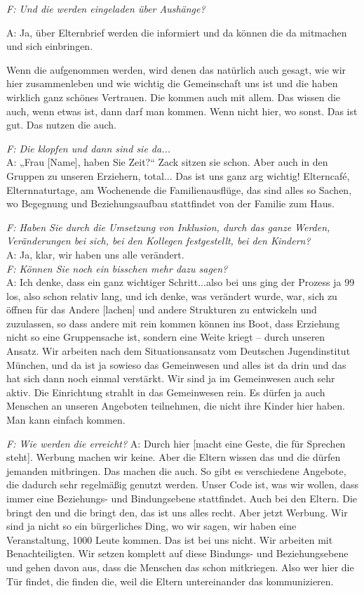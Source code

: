 \begin{linenumbers*}
\emph{F: Und die werden eingeladen über Aushänge?}

A: Ja, über Elternbrief werden die informiert und da können die da mitmachen und sich einbringen.

Wenn die aufgenommen werden, wird denen das natürlich auch gesagt, wie wir hier zusammenleben und wie wichtig die Gemeinschaft uns ist und die haben wirklich ganz schönes Vertrauen. Die kommen auch mit allem. Das wissen die auch, wenn etwas ist, dann darf man kommen. Wenn nicht hier, wo sonst. Das ist gut. Das nutzen die auch. 

\emph{F: Die klopfen und dann sind sie da...}\\
A: „Frau [Name], haben Sie Zeit?“ Zack sitzen sie schon. Aber auch in den Gruppen zu unseren Erziehern, total... Das ist uns ganz arg wichtig!
Elterncafé, Elternnaturtage, am Wochenende die Familienausflüge, das sind alles so Sachen, wo Begegnung und Beziehungsaufbau stattfindet von der Familie zum Haus.  
 
\emph{F: Haben Sie durch die Umsetzung von Inklusion, durch das ganze Werden, Veränderungen bei sich, bei den Kollegen festgestellt, bei den Kindern?}\\
A: Ja, klar, wir haben uns alle verändert.\\ 
\emph{F: Können Sie noch ein bisschen mehr dazu sagen?}\\
A: Ich denke, dass ein ganz wichtiger Schritt...also bei uns ging der Prozess ja 99 los, also schon relativ lang, und ich denke, was verändert wurde, war, sich zu öffnen für das Andere [lachen] und andere Strukturen zu entwickeln und zuzulassen, so dass andere mit rein kommen können ins Boot, dass Erziehung nicht so eine Gruppensache ist, sondern eine Weite kriegt -- durch unseren Ansatz. Wir arbeiten nach dem Situationsansatz vom Deutschen Jugendinstitut München, und da ist ja sowieso das Gemeinwesen und alles ist da drin und das hat sich dann noch einmal verstärkt. Wir sind ja im Gemeinwesen auch sehr aktiv. Die Einrichtung strahlt in das Gemeinwesen rein. Es dürfen ja auch Menschen an unseren Angeboten teilnehmen, die nicht ihre Kinder hier haben. Man kann einfach kommen.

\emph{F: Wie werden die erreicht?}
A: Durch hier [macht eine Geste, die für Sprechen steht]. Werbung machen wir keine. Aber die Eltern wissen das und die dürfen jemanden mitbringen. Das machen die auch. So gibt es verschiedene Angebote, die dadurch sehr regelmäßig genutzt werden. Unser Code ist, was wir wollen, dass immer eine Beziehungs- und Bindungsebene stattfindet. Auch bei den Eltern. Die bringt den und die bringt den, das ist uns alles recht. Aber jetzt Werbung. Wir sind ja nicht so ein bürgerliches Ding, wo wir sagen, wir haben eine Veranstaltung, 1000 Leute kommen. Das ist bei uns nicht. Wir arbeiten mit Benachteiligten. Wir setzen komplett auf diese Bindungs- und Beziehungsebene und gehen davon aus, dass die Menschen das schon mitkriegen. Also wer hier die Tür findet, die finden die, weil die Eltern untereinander das kommunizieren. 


\end{linenumbers*}
